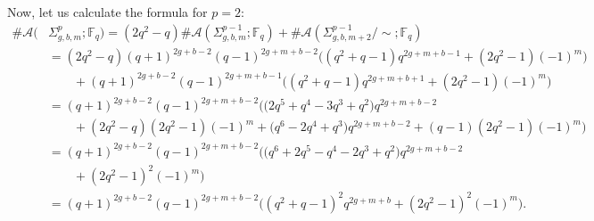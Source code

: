\documentclass[reqno,12pt]{amsart}
\theoremstyle{definition}
\theoremstyle{remark}
\theoremstyle{remark}
\numberwithin{equation}{section}
\begin{document}
Now, let us calculate the formula for $p=2$:
 \begin{align*}
    \#\mathcal{A}(&\Sigma_{g,b,m}^p; \mathbb{F}_q) = (2q^2-q) \#\mathcal{A}(\Sigma_{g,b,m}^{p-1}; \mathbb{F}_q) + \#\mathcal{A}(\Sigma_{g,b,m+2}^{p-1}/\!\sim; \mathbb{F}_q) \\
    &= (2q^2-q)(q+1)^{2g+b-2} (q-1)^{2g+m+b-2} \big((q^2 + q - 1)q^{2g+m+b-1} + (2q^2-1)(-1)^{m} \big) \\
    &\quad\quad+ (q+1)^{2g+b-2} (q-1)^{2g+m+b-1} \big((q^2 + q - 1)q^{2g+m+b+1} + (2q^2-1)(-1)^{m} \big) \\
    &= (q+1)^{2g+b-2} (q-1)^{2g+m+b-2} \big(\big(2q^5+q^4-3q^3+q^2\big)q^{2g+m+b-2}  \\ &\quad\quad  + (2q^2-q)(2q^2-1)(-1)^m + \big(q^6-2q^4+q^3\big)q^{2g+m+b-2} + (q-1)(2q^2-1)(-1)^m \big) \\
    &= (q+1)^{2g+b-2} (q-1)^{2g+m+b-2} \big(\big(q^6 + 2q^5-q^4-2q^3+q^2\big)q^{2g+m+b-2}  \\ &\quad\quad + (2q^2-1)^2(-1)^m  \big) \\
    &= (q+1)^{2g+b-2} (q-1)^{2g+m+b-2} \big((q^2+q-1)^2 q^{2g+m+b} + (2q^2-1)^2(-1)^m \big). 
\end{align*}
\end{document}
